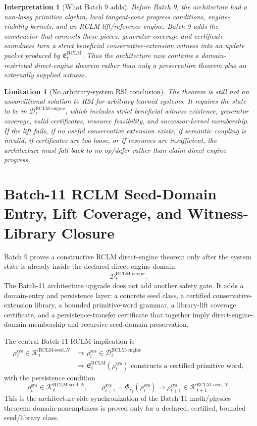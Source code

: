 \documentclass[11pt,a4paper]{article}
\newtheorem{limitation}[theorem]{Limitation}
\newtheorem{interpretation}[theorem]{Interpretation}
\newcommand{\Kcal}{\mathcal K}
\newcommand{\Dcal}{\mathcal D}
\newcommand{\RCLM}{\mathrm{RCLM}}
\newcommand{\sys}{\mathrm{sys}}
\newcommand{\engine}{\mathrm{engine}}
\begin{document}
\begin{interpretation}[What Batch 9 adds]
Before Batch 9, the architecture had a non-lossy primitive algebra, local tangent-cone progress conditions, engine-viability kernels, and an RCLM lift/reference engine. Batch 9 adds the constructor that connects these pieces: generator coverage and certificate soundness turn a strict beneficial conservative-extension witness into an update packet produced by \(\mathfrak E_t^{\RCLM}\). Thus the architecture now contains a domain-restricted direct-engine theorem rather than only a preservation theorem plus an externally supplied witness.
\end{interpretation}

\begin{limitation}[No arbitrary-system RSI conclusion]
The theorem is still not an unconditional solution to RSI for arbitrary learned systems. It requires the state to be in \(\Dcal_t^{\RCLM\text{-}\engine}\), which includes strict beneficial witness existence, generator coverage, valid certificates, resource feasibility, and successor-kernel membership. If the lift fails, if no useful conservative extension exists, if semantic coupling is invalid, if certificates are too loose, or if resources are insufficient, the architecture must fall back to no-op/defer rather than claim direct engine progress.
\end{limitation}


\section{Batch-11 RCLM Seed-Domain Entry, Lift Coverage, and Witness-Library Closure}
\label{sec:batch11-rclm-seed-domain-witness-library}

Batch 9 proves a constructive RCLM direct-engine theorem only after the system state is already inside the declared direct-engine domain
\[
\Dcal_t^{\RCLM\text{-}\engine}.
\]
The Batch-11 architecture upgrade does not add another safety gate.  It adds a domain-entry and persistence layer: a concrete seed class, a certified conservative-extension library, a bounded primitive-word grammar, a library-lift coverage certificate, and a persistence-transfer certificate that together imply direct-engine-domain membership and recursive seed-domain preservation.

The central Batch-11 RCLM implication is
\[
\begin{aligned}
\rho_t^{\sys}\in\Kcal_t^{\RCLM\text{-}\mathrm{seed},N}
&\Longrightarrow
\rho_t^{\sys}\in\Dcal_t^{\RCLM\text{-}\engine}\\
&\Longrightarrow
\mathfrak E_t^{\RCLM}(\rho_t^{\sys})
\text{ constructs a certified primitive word},
\end{aligned}
\]
with the persistence condition
\[
\rho_t^{\sys}\in\Kcal_t^{\RCLM\text{-}\mathrm{seed},N},
\qquad
\rho_{t+1}^{\sys}=\Phi_{\nu_t}(\rho_t^{\sys})
\Longrightarrow
\rho_{t+1}^{\sys}\in\Kcal_{t+1}^{\RCLM\text{-}\mathrm{seed},N}.
\]
This is the architecture-side synchronization of the Batch-11 math/physics theorem: domain-nonemptiness is proved only for a declared, certified, bounded seed/library class.
\end{document}

